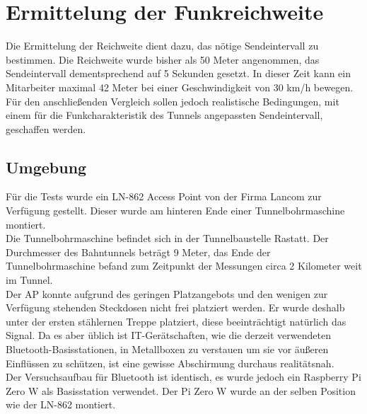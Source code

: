 \chapter{Ermittelung der Funkreichweite}
\label{ch:Reichweite}
Die Ermittelung der Reichweite dient dazu, das nötige Sendeintervall zu bestimmen.
Die Reichweite wurde bisher als 50 Meter angenommen, das Sendeintervall dementsprechend auf 5 Sekunden gesetzt.
In dieser Zeit kann ein Mitarbeiter maximal 42 Meter bei einer Geschwindigkeit von 30 km/h bewegen. 
Für den anschließenden Vergleich sollen jedoch realistische Bedingungen, mit einem für die Funkcharakteristik des Tunnels angepassten Sendeintervall, geschaffen werden.

\section{Umgebung}
Für die Tests wurde ein LN-862 Access Point von der Firma Lancom zur Verfügung gestellt.
Dieser wurde am hinteren Ende einer Tunnelbohrmaschine montiert.\\
Die Tunnelbohrmaschine befindet sich in der Tunnelbaustelle Rastatt. 
Der Durchmesser des Bahntunnels beträgt 9 Meter, das Ende der Tunnelbohrmaschine befand zum Zeitpunkt der Messungen circa 2 Kilometer weit im Tunnel.\\
Der AP konnte aufgrund des geringen Platzangebots und den wenigen zur Verfügung stehenden Steckdosen nicht frei platziert werden.
Er wurde deshalb unter der ersten stählernen Treppe platziert, diese beeinträchtigt natürlich das Signal. 
Da es aber üblich ist IT-Gerätschaften, wie die derzeit verwendeten Bluetooth-Basisstationen, in Metallboxen zu verstauen um sie vor äußeren Einflüssen zu schützen, ist eine gewisse Abschirmung durchaus realitätsnah.\\
Der Versuchsaufbau für Bluetooth ist identisch, es wurde jedoch ein Raspberry Pi Zero W als Basisstation verwendet. 
Der Pi Zero W wurde an der selben Position wie der LN-862 montiert.

